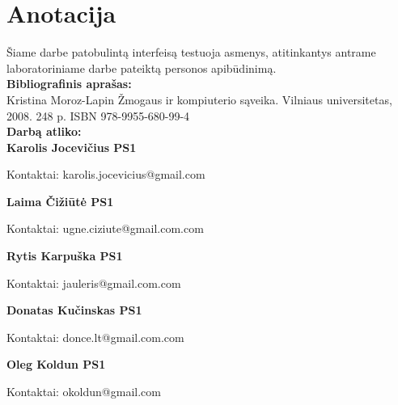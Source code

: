 

\newcommand{\anotacijaIndelis}[3]{
	\textbf{#1}
	\begin{flushleft}
	\hspace*{1cm}
	Kontaktai: #2
	\\
	\hspace*{1cm}
	Indėlis: #3
	\end{flushleft}
}

\newcommand{\anotacija}[2]{
	\textbf{#1}
	\begin{flushleft}
	\hspace*{1cm}
	Kontaktai: #2
	\end{flushleft}
}

\section*{Anotacija}

		Šiame darbe patobulintą interfeisą testuoja asmenys, atitinkantys antrame laboratoriniame darbe pateiktą personos apibūdinimą. \\
		
		\textbf{Bibliografinis aprašas:}\\
		Kristina Moroz-Lapin Žmogaus ir kompiuterio sąveika. Vilniaus universitetas, 2008. 248 p. ISBN 978-9955-680-99-4
		\\
		
		\textbf{Darbą atliko:}\\

		\anotacija{Karolis Jocevičius PS1}{karolis.jocevicius@gmail.com}
		
		\anotacija{Laima Čižiūtė PS1}{ugne.ciziute@gmail.com.com}
		
		\anotacija{Rytis Karpuška PS1}{jauleris@gmail.com.com}

		\anotacija{Donatas Kučinskas PS1}{donce.lt@gmail.com.com}

		\anotacija{Oleg Koldun PS1}{okoldun@gmail.com}